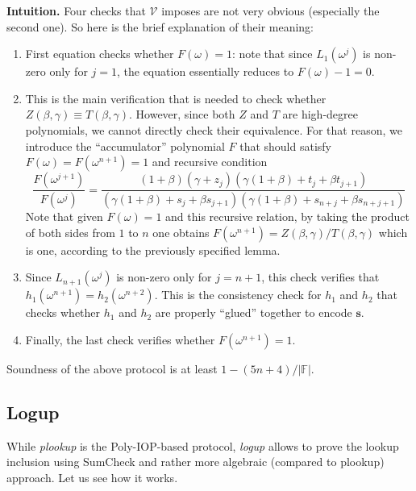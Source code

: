 \documentclass[../../book]{subfiles}
\begin{document}
\textbf{Intuition.} Four checks that $\mathcal{V}$ imposes are not very 
obvious (especially the second one). So here is the brief explanation of their meaning:
\begin{enumerate}
    \item First equation checks whether $F(\omega)=1$: note that since
    $L_1(\omega^j)$ is non-zero only for $j=1$, the equation essentially reduces
    to $F(\omega)-1=0$.
    \item This is the main verification that is needed to check whether
    $Z(\beta,\gamma) \equiv T(\beta,\gamma)$. However, since both $Z$ and $T$
    are high-degree polynomials, we cannot directly check their equivalence. For 
    that reason, we introduce the ``accumulator'' polynomial $F$ that should satisfy 
    $F(\omega) = F(\omega^{n+1}) = 1$ and recursive condition
    \begin{equation*}
        \frac{F(\omega^{j+1})}{F(\omega^j)} = \frac{(1+\beta)(\gamma+z_j)(\gamma(1+\beta)+t_j+\beta t_{j+1})}{(\gamma(1+\beta)+s_j+\beta s_{j+1})(\gamma(1+\beta) + s_{n+j} + \beta s_{n+j+1})}
    \end{equation*}
    Note that given $F(\omega)=1$ and this recursive relation, by taking the
    product of both sides from $1$ to $n$ one obtains
    $F(\omega^{n+1})=Z(\beta,\gamma)/T(\beta,\gamma)$ which is one, according to the
    previously specified lemma.
    \item Since $L_{n+1}(\omega^j)$ is non-zero only for $j=n+1$, this check
    verifies that $h_1(\omega^{n+1}) = h_2(\omega^{n+2})$. This is the
    consistency check for $h_1$ and $h_2$ that checks whether $h_1$ and $h_2$
    are properly ``glued'' together to encode $\boldsymbol{s}$.
    \item Finally, the last check verifies whether $F(\omega^{n+1})=1$.
\end{enumerate}

\begin{lemma}
    Soundness of the above protocol is at least $1-(5n+4)/|\mathbb{F}|$.
\end{lemma}

\subsection{Logup}

While \textit{plookup} is the Poly-IOP-based protocol, \textit{logup} allows to
prove the lookup inclusion using SumCheck and rather more algebraic (compared to
plookup) approach. Let us see how it works.
\end{document}
